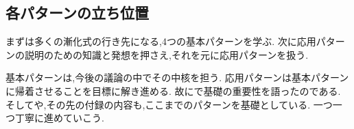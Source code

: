 \subsection{各パターンの立ち位置}\label{節：各パターンの立ち位置}

まずは多くの漸化式の行き先になる,4つの基本パターンを学ぶ.
次に応用パターンの説明のための知識と発想を押さえ,それを元に応用パターンを扱う.

基本パターンは,今後の議論の中でその中核を担う.
応用パターンは基本パターンに帰着させることを目標に解き進める.
故にで基礎の重要性を語ったのである.
そしてや,その先の付録の内容も,ここまでのパターンを基礎としている.
一つ一つ丁寧に進めていこう.
